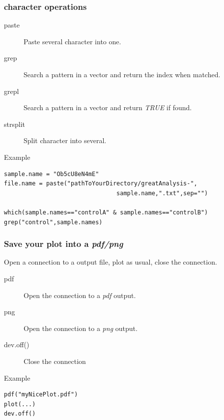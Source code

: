 \documentclass[10pt]{beamer}
\newenvironment{xframe}[2][]
  {\begin{frame}[fragile,environment=xframe,#1]
  \frametitle{#2}}
  {\end{frame}}
\begin{document}
\begin{xframe}{{\sf character} operations}
  \begin{block}{}
    \begin{description}
      \item[paste] Paste several character into one.
      \item[grep] Search a pattern in a vector and return the index when matched.
      \item[grepl] Search a pattern in a vector and return {\it TRUE} if found.
      \item[strsplit] Split character into several.
    \end{description}
  \end{block}
  \begin{exampleblock}{Example}
\begin{verbatim}
sample.name = "Ob5cU8eN4mE"
file.name = paste("pathToYourDirectory/greatAnalysis-",
                                sample.name,".txt",sep="")

which(sample.names=="controlA" & sample.names=="controlB")
grep("control",sample.names)
\end{verbatim}  
  \end{exampleblock}
\end{xframe}


\begin{xframe}{Save your plot into a {\it pdf/png}}
  \begin{block}{}
    Open a connection to a output file, plot as usual, close the connection.
    \begin{description}
    \item[pdf] Open the connection to a {\it pdf} output.
    \item[png] Open the connection to a {\it png} output.
    \item[dev.off()] Close the connection
    \end{description}
  \end{block}
  \begin{exampleblock}{Example}
\begin{verbatim}
pdf("myNicePlot.pdf")
plot(...)
dev.off()
\end{verbatim}  
  \end{exampleblock}
\end{xframe}
\end{document}
